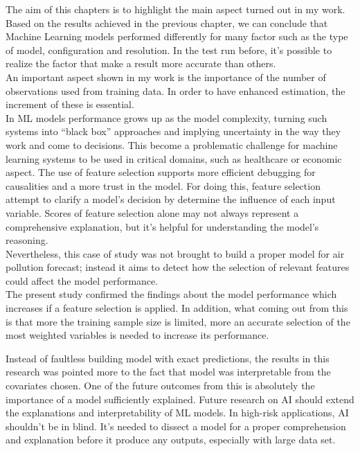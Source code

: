 The aim of this chapters is to highlight the main aspect turned out in my work.
Based on the results achieved in the previous chapter, we can conclude that Machine Learning models performed differently for many factor such as the type of model, configuration and resolution.
In the test run before, it's possible to realize the factor that make a result more accurate than others.\\
An important aspect shown in my work is the importance of the number of observations used from training data. In order to have enhanced estimation, the increment of these is essential.\\
In ML models performance grows up as the model complexity, turning such systems into “black box” approaches and implying uncertainty in the way they work and come to decisions. 
This become a problematic challenge for machine learning systems to be used in critical domains, such as healthcare or economic aspect.
The use of feature selection supports more efficient debugging for causalities and a more trust in the model.
For doing this, feature selection attempt to clarify a model’s decision by determine the influence of each input variable. 
Scores of feature selection alone may not always represent a comprehensive explanation, but it's helpful for understanding the model’s reasoning.\\
Nevertheless, this case of study was not brought to build a proper model for air pollution forecast; instead it aims to detect how the selection of relevant features could affect the model performance. \\
The present study confirmed the findings about the model performance which increases if a feature selection is applied.
In addition, what coming out from this is that more the training sample size is limited, more an accurate selection of the most weighted variables is needed to increase its performance.
\begin{comment}
In this work so it's highlighted the effect of how the training in ML should benefit from an accurate selection of variable. 
\end{comment}
Instead of faultless building model with exact predictions, the results in this research was pointed more to the fact that model was interpretable from the covariates chosen. 
One of the future outcomes from this is absolutely the importance of a model sufficiently explained.
Future research on AI should extend the explanations and interpretability of ML models.
In high-risk applications, AI shouldn't be in blind. 
It's needed to dissect a model for a proper comprehension and explanation before it produce any outputs, especially with large data set.
